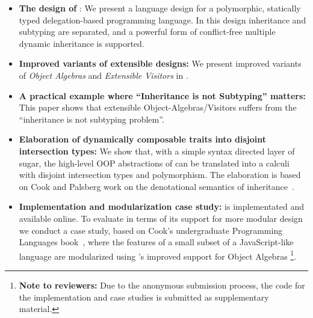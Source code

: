 \begin{itemize}

\item {\bf The design of \name}: We present a language design for a
  polymorphic, statically typed delegation-based programming language.
  In this design inheritance and subtyping are separated, and a
  powerful form of conflict-free multiple dynamic inheritance is supported.

\item {\bf Improved variants of extensible designs:} We present
  improved variants of \emph{Object
    Algebras} and \emph{Extensible Visitors} in \name. 

\item {\bf A practical example where ``Inheritance is not Subtyping''
    matters:} This paper shows that extensible Object-Algebras/Visitors
  suffers from the ``inheritance is not subtyping problem''. 

\item {\bf Elaboration of dynamically composable traits into disjoint
    intersection types:} We show that, with a simple syntax
  directed layer of sugar, the high-level OOP abstractions of \name
  can be translated into a calculi with disjoint intersection types and
  polymorphism. The elaboration is based on Cook and Palsberg work on
  the denotational semantics of inheritance~\cite{cook1989denotational}.


\item {\bf Implementation and modularization case study:} \name is implementated and
  available online. To evaluate \name in terms of its support for more
  modular design we conduct a case study, based on Cook's
  undergraduate Programming Languages book~\cite{}, where the features
  of a small subset of a JavaScript-like language  are modularized
  using \name's improved support for Object Algebras
  \footnote{{\bf Note to reviewers:} Due
    to the anonymous submission process, the code for the
    implementation and case studies is submitted as supplementary material.}. 

\end{itemize}

